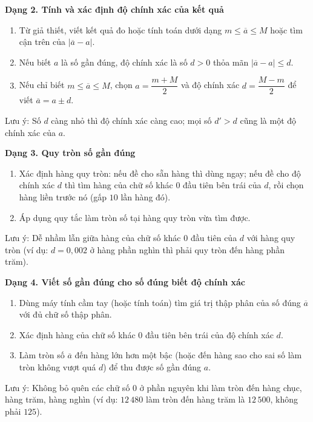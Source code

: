 \textbf{Dạng 2. Tính và xác định độ chính xác của kết quả}
\begin{enumerate}
\item Từ giả thiết, viết kết quả đo hoặc tính toán dưới dạng $m \le \overline{a} \le M$ hoặc tìm cận trên của $|\overline{a} - a|$.
\item Nếu biết $a$ là số gần đúng, độ chính xác là số $d > 0$ thỏa mãn $|\overline{a} - a| \le d$.
\item Nếu chỉ biết $m \le \overline{a} \le M$, chọn $a = \dfrac{m+M}{2}$ và độ chính xác $d = \dfrac{M-m}{2}$ để viết $\overline{a} = a \pm d$.
\end{enumerate}
Lưu ý: Số $d$ càng nhỏ thì độ chính xác càng cao; mọi số $d' > d$ cũng là một độ chính xác của $a$.

\textbf{Dạng 3. Quy tròn số gần đúng}
\begin{enumerate}
\item Xác định hàng quy tròn: nếu đề cho sẵn hàng thì dùng ngay; nếu đề cho độ chính xác $d$ thì tìm hàng của chữ số khác $0$ đầu tiên bên trái của $d$, rồi chọn hàng liền trước nó (gấp $10$ lần hàng đó).
\item Áp dụng quy tắc làm tròn số tại hàng quy tròn vừa tìm được.
\end{enumerate}
Lưu ý: Dễ nhầm lẫn giữa hàng của chữ số khác $0$ đầu tiên của $d$ với hàng quy tròn (ví dụ: $d = 0{,}002$ ở hàng phần nghìn thì phải quy tròn đến hàng phần trăm).

\textbf{Dạng 4. Viết số gần đúng cho số đúng biết độ chính xác}
\begin{enumerate}
\item Dùng máy tính cầm tay (hoặc tính toán) tìm giá trị thập phân của số đúng $\overline{a}$ với đủ chữ số thập phân.
\item Xác định hàng của chữ số khác $0$ đầu tiên bên trái của độ chính xác $d$.
\item Làm tròn số $\overline{a}$ đến hàng lớn hơn một bậc (hoặc đến hàng sao cho sai số làm tròn không vượt quá $d$) để thu được số gần đúng $a$.
\end{enumerate}
Lưu ý: Không bỏ quên các chữ số $0$ ở phần nguyên khi làm tròn đến hàng chục, hàng trăm, hàng nghìn (ví dụ: $12\,480$ làm tròn đến hàng trăm là $12\,500$, không phải $125$).

